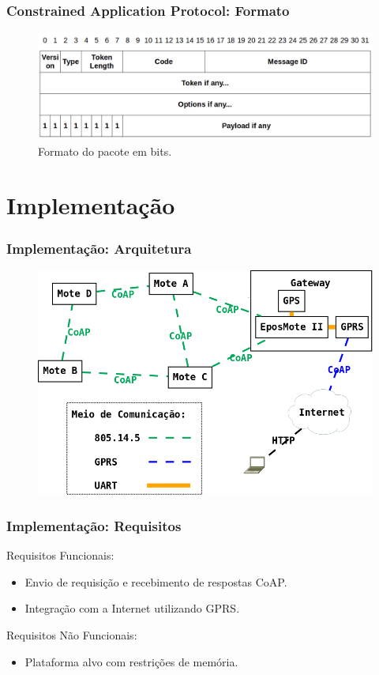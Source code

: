 \documentclass{beamer}
\begin{document}
\begin{frame}
\frametitle{Constrained Application Protocol: Formato}
\begin{figure}
\includegraphics[width=1.0\linewidth]{../figuras/formato}
\caption{Formato do pacote em bits.}
\end{figure}
\end{frame}

\section{Implementação}

\begin{frame}
\frametitle{Implementação: Arquitetura}
\begin{figure}
\includegraphics[width=0.9\linewidth]{../figuras/arquiteturaSlide}
\end{figure}
\end{frame}

\begin{frame}
\frametitle{Implementação: Requisitos}
Requisitos Funcionais:
\begin{itemize}
    \item Envio de requisição e recebimento de respostas CoAP.
    \item Integração com a Internet utilizando GPRS. 
\end{itemize}
Requisitos Não Funcionais:
\begin{itemize}
    \item Plataforma alvo com restrições de memória.
\end{itemize}
\end{frame}
\end{document}
